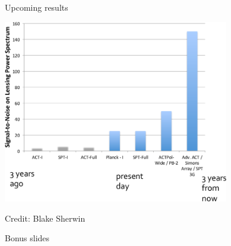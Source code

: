 \documentclass[table]{beamer}
\begin{document}
\begin{frame}{Upcoming results}
	\begin{center}
		\includegraphics[height=8cm]{plots/cmb_lensing_past_future_blake.png}

		\vspace{-0.5cm}
		{\footnotesize Credit: Blake Sherwin}
	\end{center}
\end{frame}

\begin{frame}{Bonus slides}
\end{frame}
\end{document}
